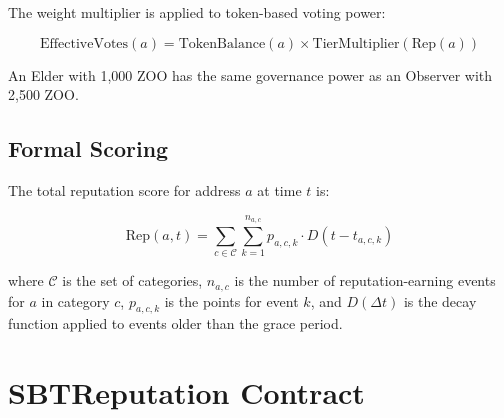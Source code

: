 \documentclass[11pt,letterpaper]{article}
\begin{document}
The weight multiplier is applied to token-based voting power:

\begin{equation}
    \text{EffectiveVotes}(a) = \text{TokenBalance}(a) \times \text{TierMultiplier}(\text{Rep}(a))
\label{eq:effective}
\end{equation}

An Elder with 1{,}000 ZOO has the same governance power as an Observer with 2{,}500 ZOO.

\subsection{Formal Scoring}

The total reputation score for address $a$ at time $t$ is:

\begin{equation}
    \text{Rep}(a, t) = \sum_{c \in \mathcal{C}} \sum_{k=1}^{n_{a,c}} p_{a,c,k} \cdot D(t - t_{a,c,k})
\label{eq:rep}
\end{equation}

where $\mathcal{C}$ is the set of categories, $n_{a,c}$ is the number of reputation-earning events for $a$ in category $c$, $p_{a,c,k}$ is the points for event $k$, and $D(\Delta t)$ is the decay function applied to events older than the grace period.

\section{SBTReputation Contract}
\label{sec:contract}
\end{document}
